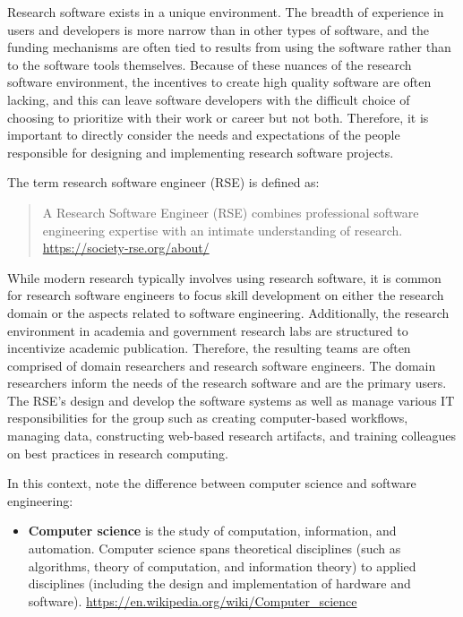 \documentclass[]{nrel}
\begin{document}
\begin{appendices} %
    

    \label{app:A}
Research software exists in a unique environment.
The breadth of experience in users and developers is more narrow than in other types of software,
and the funding mechanisms are often tied to results from using the software rather than
to the software tools themselves.
Because of these nuances of the research software environment, the incentives to create high
quality software are often lacking, and this can leave software developers with the difficult
choice of choosing to prioritize with their work or career but not both.
Therefore, it is important to directly consider the needs and expectations of the people
responsible for designing and implementing research software projects.

The term research software engineer (RSE) is defined as:
\begin{quote}

A Research Software Engineer (RSE) combines professional software engineering expertise with
an intimate understanding of research.
\url{https://society-rse.org/about/}
\end{quote}

While modern research typically involves using research software, it is common for research
software engineers to focus skill development on either the research domain or the aspects
related to software engineering.
Additionally, the research environment in academia and government research labs are structured
to incentivize academic publication.
Therefore, the resulting teams are often comprised of domain researchers and research software
engineers.
The domain researchers inform the needs of the research software and are the primary users.
The RSE’s design and develop the software systems as well as manage various IT responsibilities
for the group such as creating computer-based workflows, managing data, constructing web-based
research artifacts, and training colleagues on best practices in research computing.

In this context, note the difference between computer science and software engineering:
\begin{itemize}
\item \textbf{Computer science} is the study of computation, information, and automation.
Computer science spans theoretical disciplines (such as algorithms, theory of computation,
and information theory) to applied disciplines (including the design and implementation of
hardware and software).
\url{https://en.wikipedia.org/wiki/Computer\_science}


\end{itemize}
\end{appendices}
\end{document}
